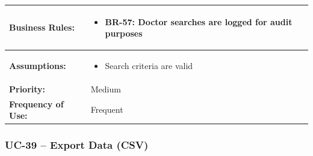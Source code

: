 \documentclass[12pt,a4paper]{article}
\begin{document}
\begin{longtable}{|p{4.5cm}|p{10.5cm}|}
\hline
\textbf{Business Rules:} &
\begin{itemize}
  \item BR-57: Doctor searches are logged for audit purposes
\end{itemize} \\
\hline
\textbf{Assumptions:} &
\begin{itemize}
  \item Search criteria are valid
\end{itemize} \\
\hline
\textbf{Priority:} & Medium \\
\hline
\textbf{Frequency of Use:} & Frequent \\
\hline
\end{longtable}

\subsubsection{UC-39 – Export Data (CSV)}
\end{document}
